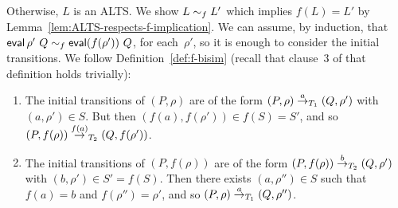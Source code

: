 Otherwise, $L$ is an ALTS\@.  We show $L \sim_f L'$ which implies $f(L) =
L'$ by Lemma~\ref{lem:ALTS-respects-f-implication}.  We can assume, by
induction, that $\mathop{\sf eval} \rho'~ Q \sim_f \mathop{\sf eval} (f(\rho'))~Q$, for
each~$\rho'$, so it is enough to consider the initial transitions.  We follow
Definition~\ref{def:f-bisim} (recall that clause~3 of that definition
holds trivially):
%
\begin{enumerate}
\item The initial transitions of $(P,\rho)$ are of the form
$(P, \rho) \stackrel{a}{\rightarrow}_{T_1} (Q, \rho')$ with $(a,\rho') \in S$.  But then
$(f(a), f(\rho')) \in f(S) = S'$, and so $(P, f(\rho)) \stackrel{f(a)}{\rightarrow}_{T_2} (Q,
f(\rho'))$.

\item The initial transitions of $(P, f(\rho))$ are of the form $(P,
f(\rho)) \stackrel{b}{\rightarrow}_{T_2} (Q, \rho')$ with $(b,\rho') \in S' = f(S)$.  Then
there exists $(a,\rho'') \in S$ such that $f(a) = b$ and $f(\rho'') = \rho'$,
and so $(P,\rho) \stackrel{a}{\rightarrow}_{T_1} (Q,\rho'')$.
\end{enumerate}






